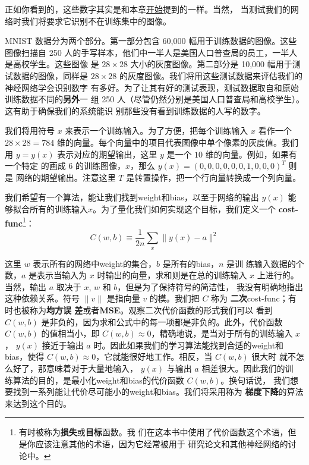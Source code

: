 正如你看到的，这些数字其实是和本章\hyperref[fig:digits]{开始}提到的一样。当然，
当测试我们的网络时我们将要求它识别不在训练集中的图像。

MNIST 数据分为两个部分。第一部分包含 60,000 幅用于训练数据的图像。这些图像扫描自
250 人的手写样本，他们中一半人是美国人口普查局的员工，一半人是高校学生。这些图像
是 $28 \times 28$ 大小的灰度图像。第二部分是 10,000 幅用于测试数据的图像，同样是
$28 \times 28$ 的灰度图像。我们将用这些测试数据来评估我们的神经网络学会识别数字
有多好。为了让其有好的测试表现，测试数据取自和原始训练数据不同的\textbf{另外}一
组 250 人（尽管仍然分别是美国人口普查局和高校学生）。这有助于确保我们的系统能识
别那些没有看到训练数据的人写的数字。

我们将用符号 $x$ 来表示一个训练输入。为了方便，把每个训练输入 $x$ 看作一个 $28
\times 28 = 784$ 维的向量。每个向量中的项目代表图像中单个像素的灰度值。我们用 $y
= y(x)$ 表示对应的期望输出，这里 $y$ 是一个 $10$ 维的向量。例如，如果有一个特定
的画成 $6$ 的训练图像，$x$，那么 $y(x) = (0, 0, 0, 0, 0, 0, 1, 0, 0, 0)^T$ 则是
网络的期望输出。注意这里 $T$ 是转置操作，把一个行向量转换成一个列向量。

我们希望有一个算法，能让我们找到\gls*{weight}和\gls*{bias}，以至于网络的输出
$y(x)$ 能够拟合所有的训练输入$x$。为了量化我们如何实现这个目标，我们定义一个
\textbf{\gls{cost-func}}\footnote{有时被称为\textbf{损失}或\textbf{目标}函数。我
  们在这本书中使用了代价函数这个术语，但是你应该注意其他的术语，因为它经常被用于
  研究论文和其他神经网络的讨论中。}：
\begin{equation}
  C(w,b) \equiv \frac{1}{2n} \sum_x \| y(x) - a\|^2
  \label{eq:6}\tag{6}
\end{equation}

这里 $w$ 表示所有的网络中\gls*{weight}的集合，$b$ 是所有的\gls*{bias}，$n$ 是训
练输入数据的个数，$a$ 是表示当输入为 $x$ 时输出的向量，求和则是在总的训练输入
$x$ 上进行的。当然，输出 $a$ 取决于 $x$, $w$ 和 $b$，但是为了保持符号的简洁性，
我没有明确地指出这种依赖关系。符号 $\|v\|$ 是指向量 $v$ 的模。我们把 $C$ 称为%
\textbf{二次}\gls*{cost-func}；有时也被称为\textbf{均方误
  差}或者\textbf{MSE}。观察二次代价函数的形式我们可以
看到 $C(w,b)$ 是非负的，因为求和公式中的每一项都是非负的。此外，代价函数
$C(w,b)$ 的值相当小，即 $C(w,b) \approx 0$，精确地说，是当对于所有的训练输入 $x$，
$y(x)$ 接近于输出 $a$ 时。因此如果我们的学习算法能找到合适的\gls*{weight}和%
\gls*{bias}，使得 $C(w,b) \approx 0$，它就能很好地工作。相反，当 $C(w,b)$ 很大时
就不怎么好了，那意味着对于大量地输入， $y(x)$ 与输出 $a$ 相差很大。因此我们的训
练算法的目的，是最小化\gls*{weight}和\gls*{bias}的代价函数 $C(w,b)$。换句话说，
我们想要找到一系列能让代价尽可能小的\gls*{weight}和\gls*{bias}。我们将采用称为%
\textbf{梯度下降}的算法来达到这个目的。

